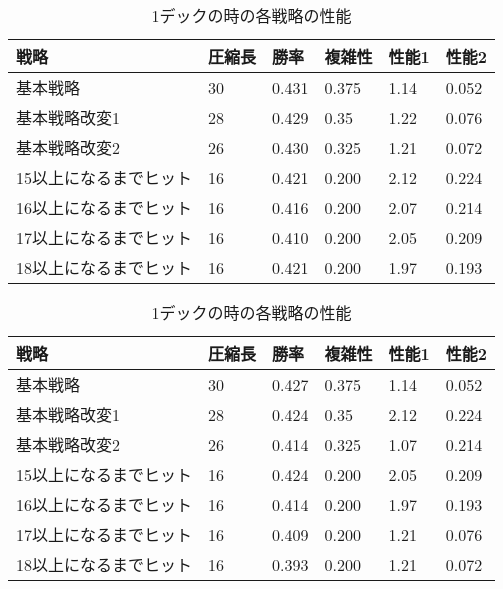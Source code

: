
\begin{table}[H]
\caption{1デックの時の各戦略の性能}
\label{table:data_type}
\begin{center}
\begin{tabular}{llllll}
戦略           & 圧縮長 & 勝率    & 複雑性   & 性能1  & 性能2   \\ \hline
基本戦略         & 30  & 0.431 & 0.375 & 1.14 & 0.052 \\
基本戦略改変1      & 28  & 0.429 & 0.35  & 1.22 & 0.076 \\
基本戦略改変2      & 26  & 0.430 & 0.325 & 1.21 & 0.072 \\
15以上になるまでヒット & 16  & 0.421 & 0.200 & 2.12 & 0.224 \\
16以上になるまでヒット & 16  & 0.416 & 0.200 & 2.07 & 0.214 \\
17以上になるまでヒット & 16  & 0.410 & 0.200 & 2.05 & 0.209 \\
18以上になるまでヒット & 16  & 0.421 & 0.200 & 1.97 & 0.193
\end{tabular}
\end{center}
\end{table}



\begin{table}[H]
\caption{1デックの時の各戦略の性能}
\label{table:data_type}
\begin{center}
\begin{tabular}{llllll}
戦略           & 圧縮長 & 勝率    & 複雑性   & 性能1  & 性能2   \\ \hline
基本戦略         & 30  & 0.427 & 0.375 & 1.14 & 0.052 \\
基本戦略改変1      & 28  & 0.424 & 0.35  & 2.12 & 0.224 \\
基本戦略改変2      & 26  & 0.414 & 0.325 & 1.07 & 0.214 \\
15以上になるまでヒット & 16  & 0.424 & 0.200 & 2.05 & 0.209 \\
16以上になるまでヒット & 16  & 0.414 & 0.200 & 1.97 & 0.193 \\
17以上になるまでヒット & 16  & 0.409 & 0.200 & 1.21 & 0.076 \\
18以上になるまでヒット & 16  & 0.393 & 0.200 & 1.21 & 0.072
\end{tabular}
\end{center}
\end{table}

